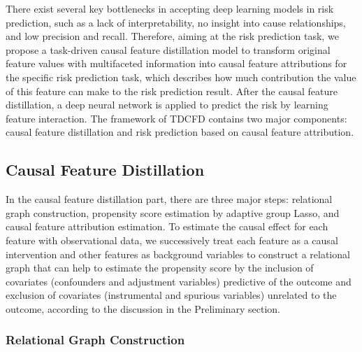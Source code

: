 \documentclass[letterpaper]{article} %
\theoremstyle{definition}
\theoremstyle{remark}
\begin{document}
There exist several key bottlenecks in accepting deep learning models in risk prediction, such as a lack of interpretability, no insight into cause relationships, and low precision and recall. Therefore, aiming at the risk prediction task, we propose a task-driven causal feature distillation model to transform original feature values with multifaceted information into causal feature attributions for the specific risk prediction task, which describes how much contribution the value of this feature can make to the risk prediction result. After the causal feature distillation, a deep neural network is applied to predict the risk by learning feature interaction. The framework of TDCFD contains two major components: causal feature distillation and risk prediction based on causal feature attribution. 


\subsection{Causal Feature Distillation}
\label{black_box}

In the causal feature distillation part, there are three major steps: relational graph construction, propensity score estimation by adaptive group Lasso, and causal feature attribution estimation. To estimate the causal effect for each feature with observational data, we successively treat each feature as a causal intervention and other features as background variables to construct a relational graph that can help to estimate the propensity score by the inclusion of covariates (confounders and adjustment variables) predictive of the outcome and exclusion of covariates (instrumental and spurious variables) unrelated to the outcome, according to the discussion in the Preliminary section. 


\subsubsection{Relational Graph Construction}
\label{prediction}
\end{document}
